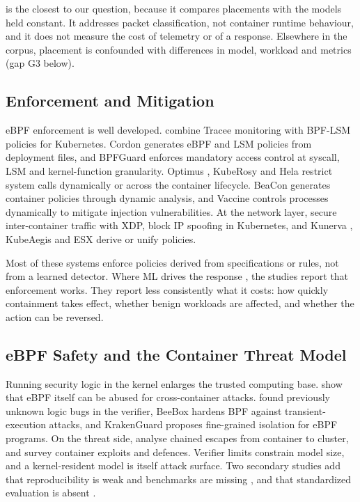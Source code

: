 \textcite{P012} is the closest to our question, because it compares placements with the models held constant. It addresses packet classification, not container runtime behaviour, and it does not measure the cost of telemetry or of a response. Elsewhere in the corpus, placement is confounded with differences in model, workload and metrics (gap G3 below).

\subsection{Enforcement and Mitigation}

eBPF enforcement is well developed. \textcite{P010} combine Tracee monitoring with BPF-LSM policies for Kubernetes. Cordon \parencite{P019} generates eBPF and LSM policies from deployment files, and BPFGuard \parencite{P020} enforces mandatory access control at syscall, LSM and kernel-function granularity. Optimus \parencite{P023}, KubeRosy \parencite{P030} and Hela \parencite{P025} restrict system calls dynamically or across the container lifecycle. BeaCon \parencite{P026} generates container policies through dynamic analysis, and Vaccine \parencite{P027} controls processes dynamically to mitigate injection vulnerabilities. At the network layer, \textcite{P009} secure inter-container traffic with XDP, \textcite{P028} block IP spoofing in Kubernetes, and Kunerva \parencite{P032}, KubeAegis \parencite{P029} and ESX \parencite{P036} derive or unify policies.

Most of these systems enforce policies derived from specifications or rules, not from a learned detector. Where ML drives the response \parencite{P005,P034}, the studies report that enforcement works. They report less consistently what it costs: how quickly containment takes effect, whether benign workloads are affected, and whether the action can be reversed.

\subsection{eBPF Safety and the Container Threat Model}

Running security logic in the kernel enlarges the trusted computing base. \textcite{P039} show that eBPF itself can be abused for cross-container attacks. \textcite{R043} found previously unknown logic bugs in the verifier, BeeBox \parencite{R042} hardens BPF against transient-execution attacks, and KrakenGuard \parencite{R041} proposes fine-grained isolation for eBPF programs. On the threat side, \textcite{P033} analyse chained escapes from container to cluster, and \textcite{R049} survey container exploits and defences. Verifier limits constrain model size, and a kernel-resident model is itself attack surface. Two secondary studies add that reproducibility is weak and benchmarks are missing \parencite{R048}, and that standardized evaluation is absent \parencite{R050}.

